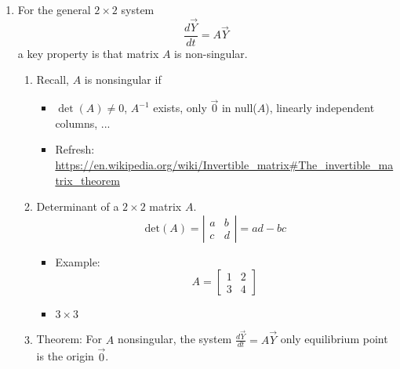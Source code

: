 \documentclass{article}
\begin{document}
\begin{enumerate}
\item For the general $2 \times 2$ system
\[
\frac{d\vec{Y}}{dt} = A \vec{Y}
\]
a key property is that matrix $A$ is non-singular.
\begin{enumerate}
\item Recall, $A$ is nonsingular if 
\begin{itemize}
\item $\det(A)\neq 0$, $A^{-1}$ exists, only $\vec{0}$ in null($A$), linearly independent columns, ...
\item Refresh: \url{https://en.wikipedia.org/wiki/Invertible_matrix#The_invertible_matrix_theorem}
\end{itemize}
\item Determinant of a $2\times 2$ matrix $A$.
\[
\text{det}(A) = \left|
\begin{array}{cc}
a & b \\
c & d 
\end{array}
\right|
= ad-bc
\]
\begin{itemize}
\item Example: 
\[
A = 
\begin{bmatrix}
1 & 2 \\
3 & 4
\end{bmatrix}
\]
\item $3 \times 3$
\end{itemize}
\item Theorem: For $A$ nonsingular, the system $\frac{d\vec{Y}}{dt} = A \vec{Y}$ only equilibrium point is the origin $\vec{0}$.
\end{enumerate}


\end{enumerate}
\end{document}
